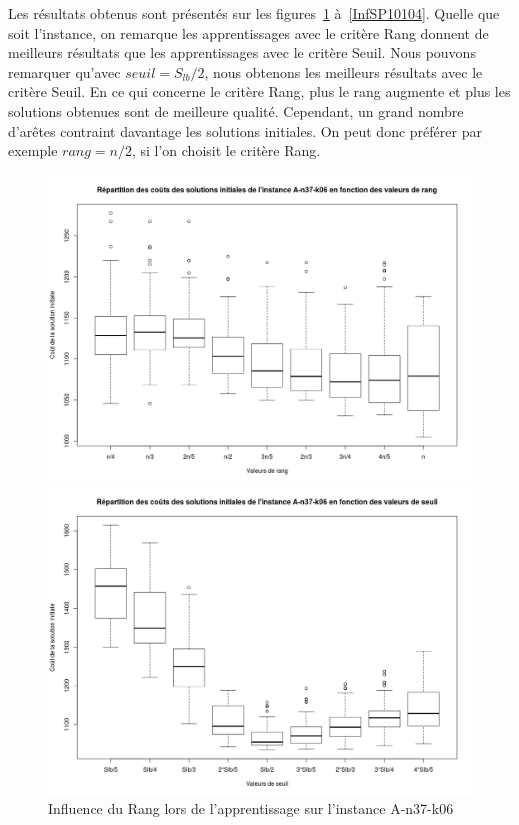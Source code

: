 \documentclass[a4paper,11pt]{article}%
\begin{document}
Les résultats obtenus sont présentés sur les figures~\ref{InfRA3706} à~\ref{InfSP10104}.
Quelle que soit l'instance, on remarque les apprentissages avec le critère Rang donnent de meilleurs résultats que les apprentissages avec le critère Seuil.
Nous pouvons remarquer qu'avec $ seuil = S_{lb}/2$, nous obtenons les meilleurs résultats avec le critère Seuil.
En ce qui concerne le critère Rang, plus le rang augmente et plus les solutions obtenues sont de meilleure qualité. Cependant, un grand nombre d'arêtes contraint davantage les solutions initiales. On peut donc préférer par exemple $rang = n/2$, si l'on choisit le critère Rang.

\begin{figure}
    \begin{minipage}[c]{.46\linewidth}

        \centering
        \includegraphics[scale=0.25]{InfluenceRangA3706}
        
        \caption{Influence du Rang lors de l'apprentissage sur l'instance A-n37-k06}
        \label{InfRA3706}

    \end{minipage}
    \hfill%
    \begin{minipage}[c]{.46\linewidth}
        \centering
        \includegraphics[scale=0.25]{InfluenceSeuilA3706}
        

\end{minipage}
\end{figure}
\end{document}
